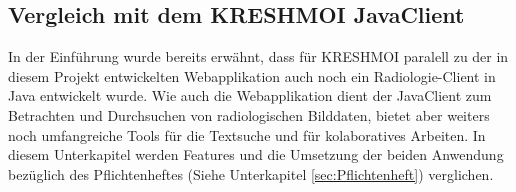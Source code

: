 \subsection{Vergleich mit dem KRESHMOI JavaClient}
\label{sec:Usability}
In der Einführung wurde bereits erwähnt, 
dass für KRESHMOI paralell zu der in diesem Projekt entwickelten Webapplikation auch noch ein Radiologie-Client in Java entwickelt wurde.
Wie auch die Webapplikation dient der JavaClient zum Betrachten und Durchsuchen von radiologischen Bilddaten,
bietet aber weiters noch umfangreiche Tools für die Textsuche und für kolaboratives Arbeiten.
In diesem Unterkapitel werden Features und die Umsetzung der beiden Anwendung bezüglich des Pflichtenheftes (Siehe Unterkapitel \ref{sec:Pflichtenheft}) verglichen.


